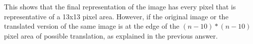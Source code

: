 \documentclass[parskip=half]{scrartcl}
\begin{document}
        This shows that the final representation of the image has every pixel that is representative of a 13x13 pixel area. However, if the original image or the translated version of the same image is at the edge of the $(n-10)*(n-10)$ pixel area of possible translation, as explained in the previous answer.



\end{document}
